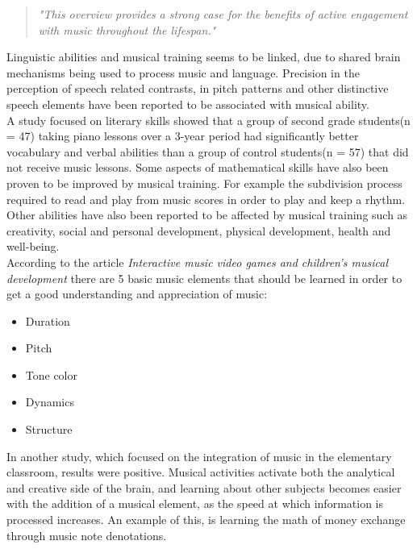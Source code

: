 \begin{quote}
	\textit{"This overview provides a strong case for the benefits of active engagement with music throughout the lifespan\cite{powerOfMusic}."}\label{quote:powerOfMusic}\\
\end{quote}

Linguistic abilities and musical training seems to be linked, due to shared brain mechanisms being used to process music and language. Precision in the perception of speech related contrasts, in pitch patterns and other distinctive speech elements have been reported to be associated with musical ability\cite{languageSkills}.\\

A study focused on literary skills showed that a group of second grade students(n = 47) taking piano lessons over a 3-year period had significantly better vocabulary and verbal abilities than a group of control students(n = 57) that did not receive music lessons\cite{vocabularySkills}.
Some aspects of mathematical skills have also been proven to be improved by musical training. For example the subdivision process required to read and play from music scores in order to play and keep a rhythm\cite{powerOfMusic}.
Other abilities have also been reported to be affected by musical training such as creativity, social and personal development, physical development, health and well-being\cite{powerOfMusic}.\\

According to the article \textit{Interactive music video games and children's musical development} there are 5 basic music elements that should be learned in order to get a good understanding and appreciation of music\cite[p.~99]{interactiveMusicVideoGames}:
\begin{itemize}\label{list:basicMusic}
	\item Duration
	\item Pitch
	\item Tone color
	\item Dynamics
	\item Structure\\
\end{itemize}

In another study, which focused on the integration of music in the elementary classroom, results were positive\cite{musicIntegration}. Musical activities activate both the analytical and creative side of the brain, and learning about other subjects becomes easier with the addition of a musical element, as the speed at which information is processed increases\cite{musicIntegration}. An example of this, is learning the math of money exchange through music note denotations\cite{musicIntegration}.\\

